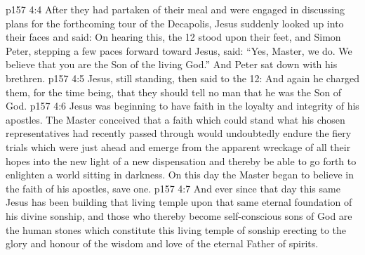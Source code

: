 \vs p157 4:4 After they had partaken of their meal and were engaged in discussing plans for the forthcoming tour of the Decapolis, Jesus suddenly looked up into their faces and said:  On hearing this, the 12 stood upon their feet, and Simon Peter, stepping a few paces forward toward Jesus, said: “Yes, Master, we do. We believe that you are the Son of the living God.” And Peter sat down with his brethren.
\vs p157 4:5 Jesus, still standing, then said to the 12:  And again he charged them, for the time being, that they should tell no man that he was the Son of God.
\vs p157 4:6 \pc Jesus was beginning to have faith in the loyalty and integrity of his apostles. The Master conceived that a faith which could stand what his chosen representatives had recently passed through would undoubtedly endure the fiery trials which were just ahead and emerge from the apparent wreckage of all their hopes into the new light of a new dispensation and thereby be able to go forth to enlighten a world sitting in darkness. On this day the Master began to believe in the faith of his apostles, save one.
\vs p157 4:7 And ever since that day this same Jesus has been building that living temple upon that same eternal foundation of his divine sonship, and those who thereby become self\hyp{}conscious sons of God are the human stones which constitute this living temple of sonship erecting to the glory and honour of the wisdom and love of the eternal Father of spirits.
